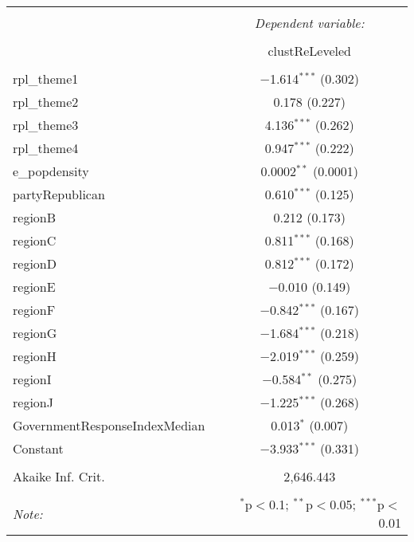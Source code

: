 
\begin{table}[!htbp] \centering 
  \caption{} 
  \label{} 
\begin{tabular}{@{\extracolsep{5pt}}lc} 
\\[-1.8ex]\hline 
\hline \\[-1.8ex] 
 & \multicolumn{1}{c}{\textit{Dependent variable:}} \\ 
\cline{2-2} 
\\[-1.8ex] & clustReLeveled \\ 
\hline \\[-1.8ex] 
 rpl\_theme1 & $-$1.614$^{***}$ (0.302) \\ 
  rpl\_theme2 & 0.178 (0.227) \\ 
  rpl\_theme3 & 4.136$^{***}$ (0.262) \\ 
  rpl\_theme4 & 0.947$^{***}$ (0.222) \\ 
  e\_popdensity & 0.0002$^{**}$ (0.0001) \\ 
  partyRepublican & 0.610$^{***}$ (0.125) \\ 
  regionB & 0.212 (0.173) \\ 
  regionC & 0.811$^{***}$ (0.168) \\ 
  regionD & 0.812$^{***}$ (0.172) \\ 
  regionE & $-$0.010 (0.149) \\ 
  regionF & $-$0.842$^{***}$ (0.167) \\ 
  regionG & $-$1.684$^{***}$ (0.218) \\ 
  regionH & $-$2.019$^{***}$ (0.259) \\ 
  regionI & $-$0.584$^{**}$ (0.275) \\ 
  regionJ & $-$1.225$^{***}$ (0.268) \\ 
  GovernmentResponseIndexMedian & 0.013$^{*}$ (0.007) \\ 
  Constant & $-$3.933$^{***}$ (0.331) \\ 
 \hline \\[-1.8ex] 
Akaike Inf. Crit. & 2,646.443 \\ 
\hline 
\hline \\[-1.8ex] 
\textit{Note:}  & \multicolumn{1}{r}{$^{*}$p$<$0.1; $^{**}$p$<$0.05; $^{***}$p$<$0.01} \\ 
\end{tabular} 
\end{table} 
